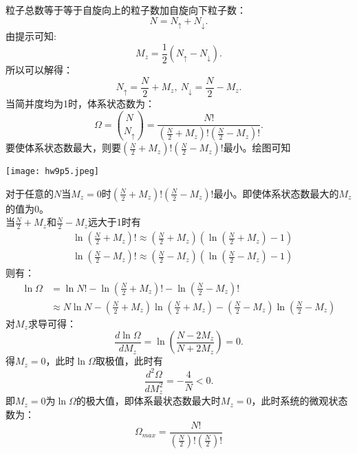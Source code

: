 \documentclass[a4paper,12pt]{article}
\begin{document}
\section{}
粒子总数等于等于自旋向上的粒子数加自旋向下粒子数：
\begin{equation}\nonumber
	N = N_{\uparrow} + N_{\downarrow}.
\end{equation}
由提示可知:
\begin{equation}\nonumber
	M_z = \frac{1}{2}(N_{\uparrow} - N_{\downarrow}).
\end{equation}
所以可以解得：
\begin{equation}\nonumber
	N_{\uparrow} = \frac{N}{2} + M_z, ~ N_{\downarrow} = \frac{N}{2} - M_z.
\end{equation}
当简并度均为1时，体系状态数为：
\begin{equation}\nonumber
	\Omega = \binom{N}{N_{\uparrow}} = \frac{N!}{\left( \frac{N}{2} + M_z \right)! \left( \frac{N}{2} - M_z \right)!}.
\end{equation}
要使体系状态数最大，则要$\left( \frac{N}{2} + M_z \right)! \left( \frac{N}{2} - M_z \right)!$最小。绘图可知
\begin{center}
	\texttt{[image: hw9p5.jpeg]} 
\end{center}
对于任意的$N$当$M_z = 0$时$\left( \frac{N}{2} + M_z \right)! \left( \frac{N}{2} - M_z \right)!$最小。即使体系状态数最大的$M_z$的值为0。\\
当$\frac{N}{2} + M_z$和$\frac{N}{2} - M_z$远大于1时有
\begin{equation}\nonumber
\begin{aligned}
	&\ln\left( \frac{N}{2} + M_z \right)! \approx \left( \frac{N}{2} + M_z \right) \left( \ln\left(\frac{N}{2} + M_z\right) - 1 \right) \\
	&\ln\left( \frac{N}{2} - M_z \right)! \approx \left( \frac{N}{2} - M_z \right) \left( \ln\left(\frac{N}{2} - M_z\right) - 1 \right)
\end{aligned}
\end{equation}
则有：
\begin{equation}\nonumber
\begin{aligned}
	\ln \Omega &= \ln N! - \ln\left( \frac{N}{2} + M_z \right)! - \ln\left( \frac{N}{2} - M_z \right)! \\
	&\approx N\ln N - \left( \frac{N}{2} + M_z \right) \ln\left(\frac{N}{2} + M_z\right) - \left( \frac{N}{2} - M_z \right) \ln\left(\frac{N}{2} - M_z\right)
\end{aligned}
\end{equation}
对$M_z$求导可得：
\begin{equation}\nonumber
	\frac{d \ln\Omega}{d M_z} = \ln\left( \frac{N - 2M_z}{N + 2M_z} \right) = 0.
\end{equation}
得$M_z = 0$，此时$\ln \Omega$取极值，此时有
\begin{equation}\nonumber
	\frac{d^2 \Omega}{d M_z^2} = -\frac{4}{N} < 0.
\end{equation}
即$M_z = 0$为$\ln\Omega$的极大值，即体系最状态数最大时$M_z = 0$，此时系统的微观状态数为：
\begin{equation}\nonumber
	\Omega_{max} = \frac{N!}{\left(\frac{N}{2}\right)!\left(\frac{N}{2}\right)!}
\end{equation}
\end{document}
